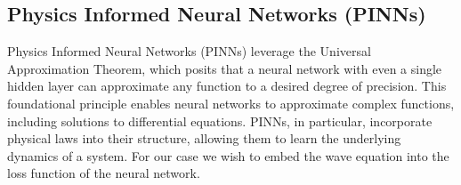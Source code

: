 \documentclass[twoside,11pt]{report}
\begin{document}
\subsection{Physics Informed Neural Networks (PINNs)}
\label{sec:DNN}

    Physics Informed Neural Networks (PINNs) leverage the Universal Approximation Theorem, which posits 
    that a neural network with even a single hidden layer can approximate any function to a desired degree 
    of precision. This foundational principle enables neural networks to approximate complex functions, including 
    solutions to differential equations.
    PINNs, in particular, incorporate physical laws into their structure, allowing them to learn the underlying 
    dynamics of a system. For our case we wish to embed the wave equation into the loss function of the neural network.
\end{document}
